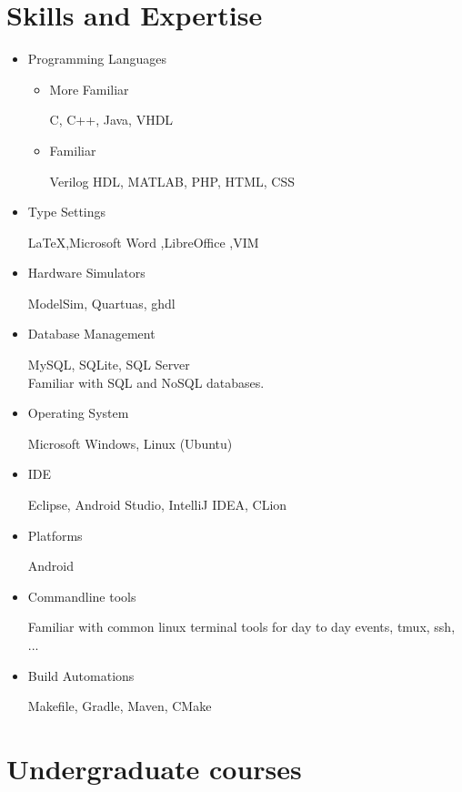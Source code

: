 \documentclass[11pt,a4paper,sans]{moderncv}
\begin{document}
\section{Skills and Expertise}
\begin{itemize}
    \item Programming Languages
        \begin{itemize}
            \item More Familiar

                C, C++, Java, VHDL
            \item Familiar

                Verilog HDL, MATLAB, PHP, HTML, CSS
        \end{itemize}
    \item Type Settings

        \LaTeX ,Microsoft Word ,LibreOffice ,VIM
    \item Hardware Simulators

        ModelSim, Quartuas, ghdl
    \item Database Management

        MySQL, SQLite, SQL Server\\
        Familiar with SQL and NoSQL databases.
    \item Operating System

        Microsoft Windows, Linux (Ubuntu)
    \item IDE

        Eclipse, Android Studio, IntelliJ IDEA, CLion
    \item Platforms

        Android
    \item Commandline tools

        Familiar with common linux terminal tools for day to day events, tmux,
        ssh, ...
    \item Build Automations

        Makefile, Gradle, Maven, CMake
\end{itemize}

\section{ Undergraduate courses}
\end{document}
